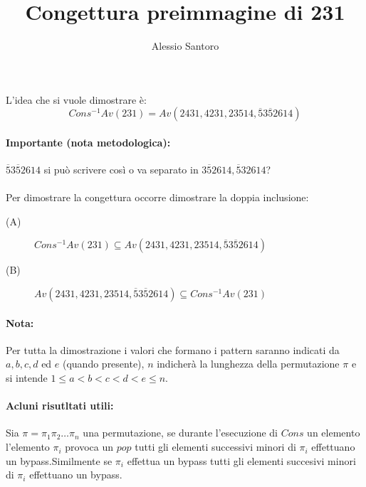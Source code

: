 \documentclass[10pt,a4paper]{article}
\author{Alessio Santoro}
\title{Congettura preimmagine di 231}
\date{}
\begin{document}
\maketitle
L'idea che si vuole dimostrare è:
$$Cons^{-1}Av(231) = Av(2431, 4231, 23514, \overline{5}3\overline{5}2614)$$
\paragraph*{Importante (nota metodologica):}$\overline{5}3\overline{5}2614$ si può scrivere così o va separato in $3\overline{5}2614, \overline{5}32614$?\\\\
Per dimostrare la congettura occorre dimostrare la doppia inclusione:
\begin{description}
\item[(A)]$Cons^{-1}Av(231) \subseteq Av(2431, 4231, 23514, \overline{5}3\overline{5}2614)$
\item[(B)]$Av(2431, 4231, 23514, \overline{5}3\overline{5}2614) \subseteq Cons^{-1}Av(231)$
\end{description}
\paragraph*{Nota:}Per tutta la dimostrazione i valori che formano i pattern saranno indicati da $a,b,c,d$ ed $e$ (quando presente), $n$ indicherà la lunghezza della permutazione $\pi$ e si intende $1\leq{a}<b<c<d<e\leq{n}$.
\paragraph*{Acluni risutltati utili:} Sia $\pi=\pi_1\pi_2\dots\pi_n$ una permutazione, se durante l'esecuzione di $Cons$ un elemento l'elemento $\pi_i$ provoca un $pop$ tutti gli elementi successivi minori di $\pi_i$ effettuano un bypass.Similmente se $\pi_i$ effettua un bypass tutti gli elementi succesivi minori di $\pi_i$ effettuano un bypass.
\end{document}
